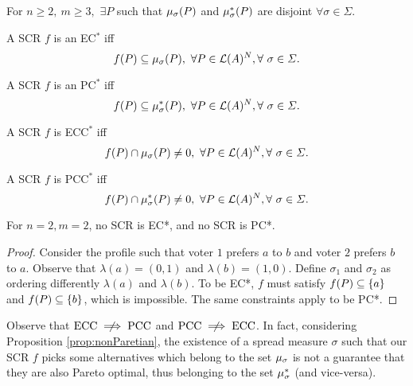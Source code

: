 \documentclass[version=3.21, pagesize, twoside=off, bibliography=totoc, DIV=calc, fontsize=12pt, a4paper]{scrartcl}
\begin{document}
\begin{corollary}
	For $n\geq 2, \ m\geq3,$ $\exists P$ such that $\mu_{\sigma}(P)$ and $\mu_{\sigma}^*(P)$ are disjoint  $\forall \sigma \in \Sigma$.
\end{corollary}

\begin{definition} A SCR $f$ is an EC$^*$ iff \[f(P) \subseteq \mu_{\sigma}(P), \ \forall P \in \mathcal{L}(A)^N, \forall \ \sigma \in \Sigma.\]
\end{definition}

\begin{definition} A SCR $f$ is an PC$^*$ iff \[f(P) \subseteq \mu_{\sigma}^*(P), \ \forall P \in \mathcal{L}(A)^N, \forall \ \sigma \in \Sigma.\]
\end{definition}

\begin{definition} A SCR $f$ is ECC$^*$ iff \[f(P) \cap \mu_{\sigma}(P) \neq 0, \ \forall P \in \mathcal{L}(A)^N, \forall \ \sigma \in \Sigma.\]
\end{definition}

\begin{definition} A SCR $f$ is PCC$^*$ iff \[ f(P) \cap \mu_{\sigma}^*(P) \neq 0, \ \forall P \in \mathcal{L}(A)^N, \forall \ \sigma \in \Sigma.\]
\end{definition}

\begin{proposition}
	For $n=2, m=2$, no SCR is EC*, and no SCR is PC*.
\end{proposition}
\begin{proof}
	Consider the profile such that voter $1$ prefers $a$ to $b$ and voter $2$ prefers $b$ to $a$. Observe that $\lambda(a) = (0, 1)$ and $\lambda(b) = (1, 0)$. Define $\sigma_1$ and $\sigma_2$ as ordering differently $\lambda(a)$ and $\lambda(b)$. To be EC*, $f$ must satisfy $f(P) \subseteq \{a\}$ and $f(P) \subseteq \{b\}$, which is impossible. The same constraints apply to be PC*.
\end{proof}

\begin{remark}
	Observe that $\text{ECC} \centernot \implies \text{PCC}$ and $\text{PCC} \centernot \implies \text{ECC}$.
	In fact, considering Proposition \ref{prop:nonParetian}, the existence of a spread measure $\sigma$ such that our SCR $f$ picks some alternatives which belong to the set $\mu_{\sigma}$ is not a guarantee that they are also Pareto optimal, thus belonging to the set $\mu_{\sigma}^*$ (and vice-versa).
\end{remark}
\end{document}
